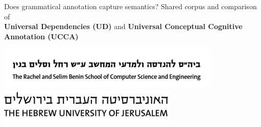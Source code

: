 \documentclass[extrafontsizes,60pt,twocolumn]{memoir}
\begin{document}
\begin{strip}
\begin{center}
\begin{minipage}[b]{.6\linewidth}
    \vspace{.7in}
    \titlespacing*{\section}{0pt}{8mm}{.5in}
    \begin{adjustbox}{margin=.5in,frame,minipage=.95\linewidth,center}
      \centering\Large
      Does grammatical annotation capture semantics? \hfill
      Shared corpus and comparison of \\
      \LARGE
      \textbf{\color{red} Universal Dependencies (UD)} \hfill and \hfill
      \textbf{\color{blue} Universal Conceptual Cognitive Annotation (UCCA)}
    \end{adjustbox}
  \end{minipage}
  \hspace{1in}
  \begin{minipage}[b]{.15\linewidth}
    \hspace{-1in} \includegraphics[width=1.12\linewidth]{cse_banner.jpg} \\
    \includegraphics[width=\linewidth]{huji_banner.png}
    \vspace{-2.5in}
  \end{minipage}
  \begin{minipage}[b]{.05\linewidth}

\end{minipage}
\end{center}
\end{strip}
\end{document}
